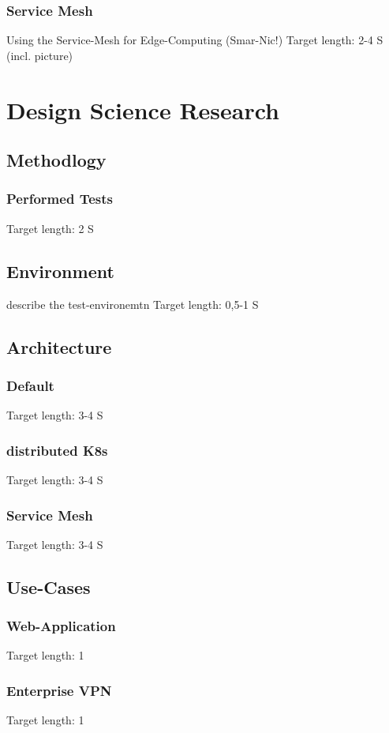 \documentclass[MSC,Master,english]{twbook}%
\begin{document}
\subsection{Service Mesh}
Using the Service-Mesh for Edge-Computing (Smar-Nic!)
Target length: 2-4 S (incl. picture)


\chapter{Design Science Research}
\label{chap:dsr}

\section{Methodlogy}
\label{sec:dsrmethode}
\subsection{Performed Tests}
Target length: 2 S

\section{Environment}
\label{sec:env}
describe the test-environemtn
Target length: 0,5-1 S

\section{Architecture}
\label{sec:dsrarchitecture}
\subsection{Default}
Target length: 3-4 S
\subsection{distributed K8s}
Target length: 3-4 S
\subsection{Service Mesh}
Target length: 3-4 S

\section{Use-Cases}
\subsection{Web-Application}
Target length: 1
\subsection{Enterprise VPN}
Target length: 1
\end{document}
